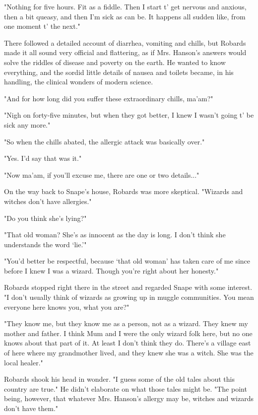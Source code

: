 "Nothing for five hours. Fit as a fiddle. Then I start t' get nervous and anxious, then a bit queasy, and then I'm sick as can be. It happens all sudden like, from one moment t' the next."

There followed a detailed account of diarrhea, vomiting and chills, but Robards made it all sound very official and flattering, as if Mrs. Hanson's answers would solve the riddles of disease and poverty on the earth. He wanted to know everything, and the sordid little details of nausea and toilets became, in his handling, the clinical wonders of modern science.

"And for how long did you suffer these extraordinary chills, ma'am?"

"Nigh on forty-five minutes, but when they got better, I knew I wasn't going t' be sick any more."

"So when the chills abated, the allergic attack was basically over."

"Yes. I'd say that was it."

"Now ma'am, if you'll excuse me, there are one or two details..."

On the way back to Snape's house, Robards was more skeptical. "Wizards and witches don't have allergies."

"Do you think she's lying?"

"That old woman? She's as innocent as the day is long. I don't think she understands the word `lie.'"

"You'd better be respectful, because `that old woman' has taken care of me since before I knew I was a wizard. Though you're right about her honesty."

Robards stopped right there in the street and regarded Snape with some interest. "I don't usually think of wizards as growing up in muggle communities. You mean everyone here knows you, what you are?"

"They know me, but they know me as a person, not as a wizard. They knew my mother and father. I think Mum and I were the only wizard folk here, but no one knows about that part of it. At least I don't think they do. There's a village east of here where my grandmother lived, and they knew she was a witch. She was the local healer."

Robards shook his head in wonder. "I guess some of the old tales about this country are true." He didn't elaborate on what those tales might be. "The point being, however, that whatever Mrs. Hanson's allergy may be, witches and wizards don't have them."

